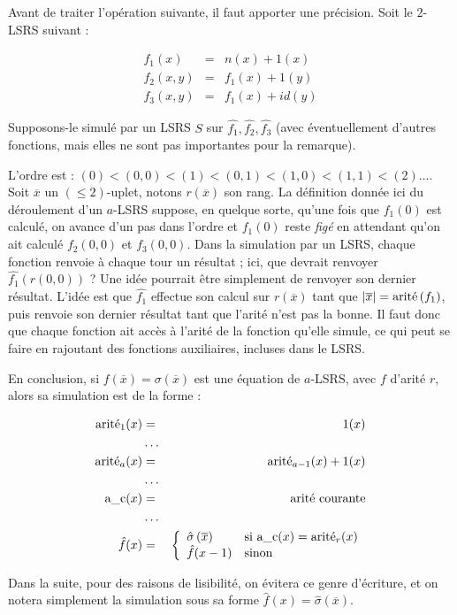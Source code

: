 	\begin{remark}
		\label{rk:fonctions_en_attente}
		Avant de traiter l'opération suivante, il faut apporter une précision. Soit le $2$-LSRS suivant :
		
		\begin{eqnarray}
			f_1(x) & = & n(x) + 1(x) \\
			f_2(x,y) & = & f_1(x) + 1(y) \\
			f_3(x,y) & = & f_1(x) + id(y)
		\end{eqnarray}
	
		Supposons-le simulé par un LSRS $S$ sur $\hat{f_1}, \hat{f_2}, \hat{f_3}$ (avec éventuellement d'autres fonctions, mais elles ne sont pas importantes pour la remarque).
		
		L'ordre est : $(0) < (0,0) < (1) < (0,1) < (1,0) < (1,1) < (2) \dots$. Soit $\overline{x}$ un $\left(\leqslant 2\right)$-uplet, notons $r(\overline{x})$ son rang. La définition donnée ici du déroulement d'un $a$-LSRS suppose, en quelque sorte, qu'une fois que $f_1(0)$ est calculé, on avance d'un pas dans l'ordre et $f_1(0)$ reste \emph{figé} en attendant qu'on ait calculé $f_2(0,0)$ et $f_3(0,0)$. Dans la simulation par un LSRS, chaque fonction renvoie à chaque tour un résultat ; ici, que devrait renvoyer $\hat{f_1}(r(0,0))$ ? Une idée pourrait être simplement de renvoyer son dernier résultat. L'idée est que $\hat{f_1}$ effectue son calcul sur $r\left(\overline{x}\right)$ tant que $\left|\overline{x}\right| = \text{arité}\left(f_1\right)$, puis renvoie son dernier résultat tant que l'arité n'est pas la bonne. Il faut donc que chaque fonction ait accès à l'arité de la fonction qu'elle simule, ce qui peut se faire en rajoutant des fonctions auxiliaires, incluses dans le LSRS. 
		
		En conclusion, si $f\left(\overline{x}\right) = \sigma\left(\overline{x}\right)$ est une équation de $a$-LSRS, avec $f$ d'arité $r$, alors sa simulation est de la forme :
	
		\begin{eqnarray}
			\text{arité}_1(x) & = & 1(x) \\
			 & \dots & \nonumber \\
			\text{arité}_a(x) & = & \text{arité}_{a-1}(x) + 1(x) \\
			 & \dots & \nonumber \\
			\text{a\_c}(x) & = & \text{arité courante} \\
			 & \dots & \nonumber \\
			\hat{f}(x) & = & \left\lbrace \begin{array}{ll} 
								\hat{\sigma}\left(\overline{x}\right) & \text{si $\text{a\_c}(x) = \text{arité}_r(x)$}\\
								\hat{f}(x-1) & \text{sinon}
								 \end{array} \right.
		\end{eqnarray}
	
		Dans la suite, pour des raisons de lisibilité, on évitera ce genre d'écriture, et on notera simplement la simulation sous sa forme $\hat{f}(x) = \hat{\sigma}\left(\overline{x}\right)$.
	\end{remark}
	
